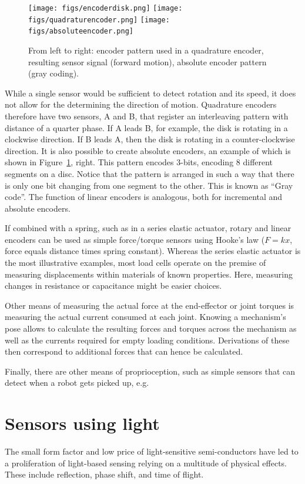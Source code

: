 \begin{figure}
	\centering
		\texttt{[image: figs/encoderdisk.png]}
		\texttt{[image: figs/quadraturencoder.png]}
		\texttt{[image: figs/absoluteencoder.png]}
	\caption{From left to right: encoder pattern used in a quadrature encoder, resulting sensor signal (forward motion), absolute encoder pattern (gray coding).}
	\label{fig:encoders}
\end{figure}

While a single sensor would be sufficient to detect rotation and its speed, it does not allow for the determining the direction of motion. Quadrature encoders therefore have two sensors, A and B, that register an interleaving pattern with distance of a quarter phase. If A leads B, for example, the disk is rotating in a clockwise direction. If B leads A, then the disk is rotating in a counter-clockwise direction. It is also possible to create absolute encoders, an example of which is shown in Figure~\ref{fig:encoders}, right. This pattern encodes 3-bits, encoding 8 different segments on a disc. Notice that the pattern is arranged in such a way that there is only one bit changing from one segment to the other. This is known as ``Gray code''. The function of linear encoders is analogous, both for incremental and absolute encoders.

If combined with a spring, such as in a series elastic actuator, rotary and linear encoders can be used as simple force/torque sensors using Hooke's law ($F=kx$, force equals distance times spring constant). Whereas the series elastic actuator is the most illustrative examples, most load cells operate on the premise of measuring displacements within materials of known properties. Here, measuring changes in resistance or capacitance might be easier choices.

Other means of measuring the actual force at the end-effector or joint torques is measuring the actual current consumed at each joint. Knowing a mechanism's pose allows to calculate the resulting forces and torques across the mechanism as well as the currents required for empty loading conditions. Derivations of these then correspond to additional forces that can hence be calculated.

Finally, there are other means of proprioception, such as simple sensors that can detect when a robot gets picked up, e.g.

\section{Sensors using light}
The small form factor and low price of light-sensitive semi-conductors have led to a proliferation of light-based sensing relying on a multitude of physical effects. These include reflection, phase shift, and time of flight.

